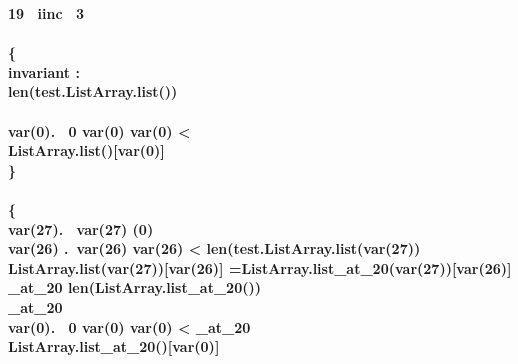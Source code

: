 \bf{ 19 \ iinc  \ 3  } \\

\\
\{ \\
\bf{invariant :}\\ 
    \leq len(test.ListArray.list()) \wedge \\
     \wedge  \\
\forall  var(0). \ 0 \leq var(0) \wedge var(0) <  \Rightarrow   \\
\Myspace ListArray.list()[var(0)] \neq {}   \\
\} \\


\\

\{ \\
 \forall  var(27). \   var(27) \neq \locVar(0)  \wedge \\ 
 \forall  var(26) .\ var(26)  \wedge var(26) < len(test.ListArray.list(var(27)) \Rightarrow \\ 
 \Myspace ListArray.list(var(27))[var(26)] =ListArray.list\_at\_20(var(27))[var(26)]  \wedge \\ 
 \Myspace {}\_at\_20 \leq len(ListArray.list\_at\_20()) \wedge \\ 
 \Myspace {}\_at\_20   \wedge \\ 
 \Myspace \forall  var(0). \  0 \leq var(0) \wedge var(0) < \_at\_20  \Rightarrow \\ 
\Myspace \Myspace ListArray.list\_at\_20()[var(0)] \neq {} 

\\    \Rightarrow \\ 

